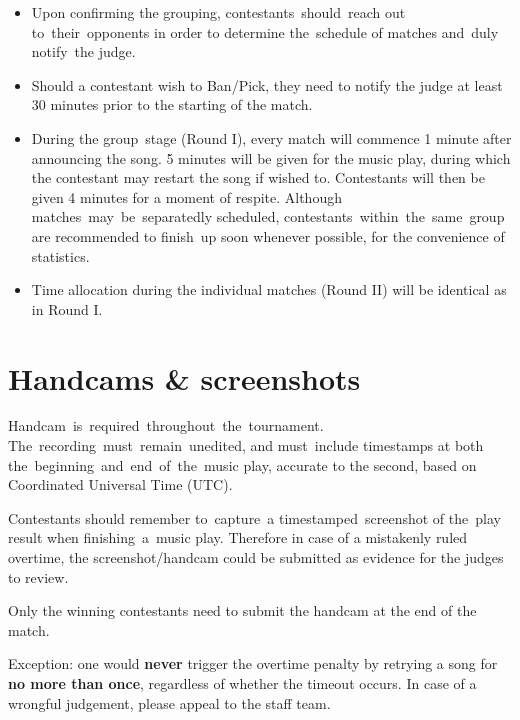 \documentclass{article}
\begin{document}
\begin{itemize}

	\item Upon confirming the grouping,
	      contestants should reach out to their opponents
	      in order to determine the schedule of matches
	      and duly notify the judge.

	\item Should a contestant wish to Ban/Pick,
	      they need to notify the judge at least 30 minutes
	      prior to the starting of the match.

	\item During the group stage (Round I),
	      every match will commence 1 minute
	      after announcing the song.
	      5 minutes will be given for the music play,
	      during which the contestant may restart the song if wished to.
	      Contestants will then be given 4 minutes for
	      a moment of respite.
	      Although matches may be separatedly scheduled,  %
	      contestants within the same group are recommended
	      to finish up soon whenever possible,
	      for the convenience of statistics.  %

	\item Time allocation during the individual matches (Round II) will be identical as in Round I.
\end{itemize}

\section{Handcams \& screenshots}

Handcam is required throughout the tournament.
The recording must remain unedited,
and must include timestamps
at both the beginning and end of the music play,
accurate to the second,
based on Coordinated Universal Time (UTC).

Contestants should remember to capture a timestamped screenshot
of the play result
when finishing a music play.
Therefore in case of a mistakenly ruled overtime,
the screenshot/handcam could be
submitted as evidence for the judges to review.

Only the winning contestants need to submit the handcam
at the end of the match.

Exception: one would \textbf{never}
trigger the overtime penalty
by retrying a song
for \textbf{no more than once},
regardless of whether the timeout occurs.
In case of a wrongful judgement,
please appeal to the staff team.
\end{document}
